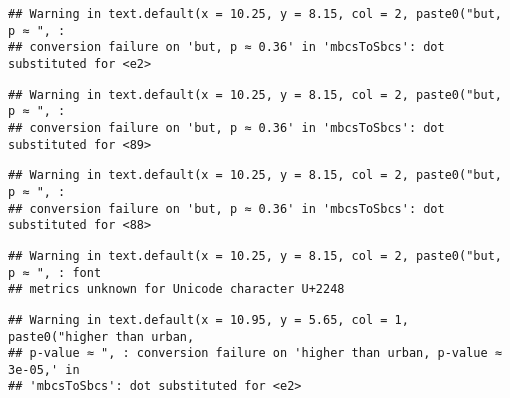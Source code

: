 \documentclass[
]{article}
\newenvironment{Shaded}{\begin{snugshade}}{\end{snugshade}}
\newcommand{\AttributeTok}[1]{\textcolor[rgb]{0.77,0.63,0.00}{#1}}
\newcommand{\DecValTok}[1]{\textcolor[rgb]{0.00,0.00,0.81}{#1}}
\newcommand{\FloatTok}[1]{\textcolor[rgb]{0.00,0.00,0.81}{#1}}
\newcommand{\FunctionTok}[1]{\textcolor[rgb]{0.00,0.00,0.00}{#1}}
\newcommand{\NormalTok}[1]{#1}
\newcommand{\SpecialCharTok}[1]{\textcolor[rgb]{0.00,0.00,0.00}{#1}}
\newcommand{\StringTok}[1]{\textcolor[rgb]{0.31,0.60,0.02}{#1}}
\begin{document}
\begin{verbatim}
## Warning in text.default(x = 10.25, y = 8.15, col = 2, paste0("but, p ≈ ", :
## conversion failure on 'but, p ≈ 0.36' in 'mbcsToSbcs': dot substituted for <e2>
\end{verbatim}

\begin{verbatim}
## Warning in text.default(x = 10.25, y = 8.15, col = 2, paste0("but, p ≈ ", :
## conversion failure on 'but, p ≈ 0.36' in 'mbcsToSbcs': dot substituted for <89>
\end{verbatim}

\begin{verbatim}
## Warning in text.default(x = 10.25, y = 8.15, col = 2, paste0("but, p ≈ ", :
## conversion failure on 'but, p ≈ 0.36' in 'mbcsToSbcs': dot substituted for <88>
\end{verbatim}

\begin{verbatim}
## Warning in text.default(x = 10.25, y = 8.15, col = 2, paste0("but, p ≈ ", : font
## metrics unknown for Unicode character U+2248
\end{verbatim}

\begin{Shaded}
\end{Shaded}

\begin{verbatim}
## Warning in text.default(x = 10.95, y = 5.65, col = 1, paste0("higher than urban,
## p-value ≈ ", : conversion failure on 'higher than urban, p-value ≈ 3e-05,' in
## 'mbcsToSbcs': dot substituted for <e2>
\end{verbatim}
\end{document}
